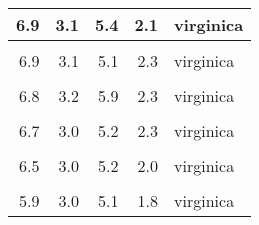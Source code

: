 \documentclass[
]{article}
\begin{document}
\begin{table}
\begin{tabular}[t]{r|r|r|r|l}
\hline
6.9 & 3.1 & 5.4 & 2.1 & virginica\\
\hline
\cellcolor{gray!6}{6.7} & \cellcolor{gray!6}{3.1} & \cellcolor{gray!6}{5.6} & \cellcolor{gray!6}{2.4} & \cellcolor{gray!6}{virginica}\\
\hline
6.9 & 3.1 & 5.1 & 2.3 & virginica\\
\hline
\cellcolor{gray!6}{5.8} & \cellcolor{gray!6}{2.7} & \cellcolor{gray!6}{5.1} & \cellcolor{gray!6}{1.9} & \cellcolor{gray!6}{virginica}\\
\hline
6.8 & 3.2 & 5.9 & 2.3 & virginica\\
\hline
\cellcolor{gray!6}{6.7} & \cellcolor{gray!6}{3.3} & \cellcolor{gray!6}{5.7} & \cellcolor{gray!6}{2.5} & \cellcolor{gray!6}{virginica}\\
\hline
6.7 & 3.0 & 5.2 & 2.3 & virginica\\
\hline
\cellcolor{gray!6}{6.3} & \cellcolor{gray!6}{2.5} & \cellcolor{gray!6}{5.0} & \cellcolor{gray!6}{1.9} & \cellcolor{gray!6}{virginica}\\
\hline
6.5 & 3.0 & 5.2 & 2.0 & virginica\\
\hline
\cellcolor{gray!6}{6.2} & \cellcolor{gray!6}{3.4} & \cellcolor{gray!6}{5.4} & \cellcolor{gray!6}{2.3} & \cellcolor{gray!6}{virginica}\\
\hline
5.9 & 3.0 & 5.1 & 1.8 & virginica\\
\hline
\end{tabular}
\end{table}
\end{document}
